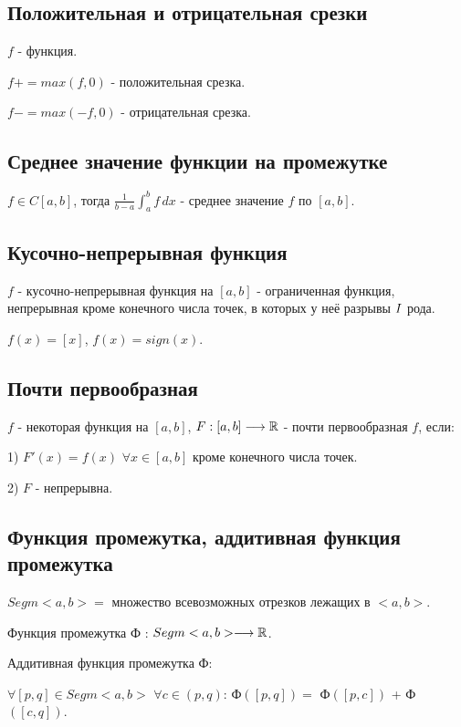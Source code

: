 \documentclass[../main.tex]{subfiles}
\begin{document}
\subsection{Положительная и отрицательная срезки}\label{subsec:1.8}

$f$ - функция.

$f+ = max(f, 0)$ - положительная срезка.

$f- = max(-f, 0)$ - отрицательная срезка.



\subsection{Среднее значение функции на промежутке}

$f \in C[a, b]$, тогда $\frac{1}{b-a} \int_{a}^{b} f \,dx$ - среднее значение $f$ по $[a, b]$.


\subsection{Кусочно-непрерывная функция}

$f$ - кусочно-непрерывная функция на $[a, b]$ - ограниченная функция, непрерывная кроме конечного числа точек, в которых у неё разрывы $\MakeUppercase{\romannumeral 1}$ рода.

$f(x) = [x]$, $f(x) = sign(x)$.


\subsection{Почти первообразная}

$f$ - некоторая функция на $[a, b]$, $F : [a, b] \longrightarrow \mathbb{R}$ - почти первообразная $f$, если:

1) $F'(x) = f(x)$  $\forall x \in [a, b]$ кроме конечного числа точек.

2) $F$ - непрерывна.


\subsection{Функция промежутка, аддитивная функция промежутка}

$Segm<a,b> =$ множество всевозможных отрезков лежащих в $<a, b>$.

Функция промежутка Ф : $Segm<a,b> \longrightarrow \mathbb{R}$.

Аддитивная функция промежутка Ф:

$\forall [p, q] \in Segm<a, b>$ $\forall c \in (p, q)$: Ф$([p, q]) =$ Ф$([p, c])$ + Ф$([c, q])$.
\newpage
\end{document}
